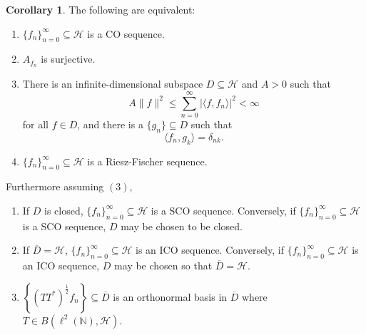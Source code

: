 \documentclass[11pt]{amsart}
\theoremstyle{definition}
\newtheorem{cor}{Corollary}[section]
\numberwithin{equation}{section}
\newcommand{\Hcal}{\mathcal{H}} %
\begin{document}
\begin{cor}\label{COcor}
The following are equivalent:
\begin{enumerate}
    \item $\{f_n\}_{n=0}^{\infty}\subseteq \Hcal$ is a CO sequence.
    \item $A_{f_n}$ is surjective.
    \item There is an infinite-dimensional subspace $D\subseteq \Hcal$ and $A>0$ such that
$$A\|f\|^2 \leq \sum_{n=0}^{\infty}|\langle f, f_n\rangle|^{2}<\infty $$
for all $f\in D$, and there is a $\{g_{n}\}\subseteq D$ such that
$$\langle f_n,g_k\rangle=\delta_{nk}.$$
\item $\{f_n\}_{n=0}^{\infty}\subseteq \Hcal$ is a Riesz-Fischer sequence.
\end{enumerate}

Furthermore assuming $(3)$,
\begin{enumerate}
    \item If $D$ is closed, $\{f_n\}_{n=0}^{\infty}\subseteq \Hcal$ is a SCO sequence. Conversely, if $\{f_n\}_{n=0}^{\infty}\subseteq \Hcal$ is a SCO sequence, $D$ may be chosen to be closed.
    \item If $\overline{D}=\Hcal$, $\{f_n\}_{n=0}^{\infty}\subseteq \Hcal$ is an ICO sequence. Conversely, if \newline $\{f_n\}_{n=0}^{\infty}\subseteq \Hcal$ is an ICO sequence, $D$ may be chosen so that $\overline{D}=\mathcal{H}.$
    \item 
   $\left\{(TT^{*})^{\frac{1}{2}}f_n \right\}\subseteq \overline{D}$ is an orthonormal basis in $\overline{D}$ where \newline $T\in B(\ell^2(\mathbb{N}), \Hcal)$.
\end{enumerate}
\end{cor}
\end{document}
